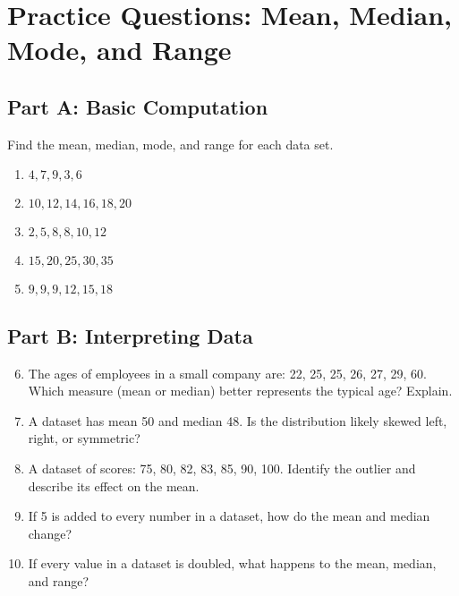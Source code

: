 \documentclass[12pt]{article}
\begin{document}
\newpage


\section*{Practice Questions: Mean, Median, Mode, and Range}

\subsection*{Part A: Basic Computation}
Find the mean, median, mode, and range for each data set.
\begin{enumerate}
  \item \(4, 7, 9, 3, 6\)
  \item \(10, 12, 14, 16, 18, 20\)
  \item \(2, 5, 8, 8, 10, 12\)
  \item \(15, 20, 25, 30, 35\)
  \item \(9, 9, 9, 12, 15, 18\)
\end{enumerate}

\subsection*{Part B: Interpreting Data}
\begin{enumerate}
  \setcounter{enumi}{5}
  \item The ages of employees in a small company are: 22, 25, 25, 26, 27, 29, 60.  
  Which measure (mean or median) better represents the typical age? Explain.
  \item A dataset has mean 50 and median 48. Is the distribution likely skewed left, right, or symmetric?
  \item A dataset of scores: 75, 80, 82, 83, 85, 90, 100. Identify the outlier and describe its effect on the mean.
  \item If 5 is added to every number in a dataset, how do the mean and median change?
  \item If every value in a dataset is doubled, what happens to the mean, median, and range?
\end{enumerate}
\end{document}
